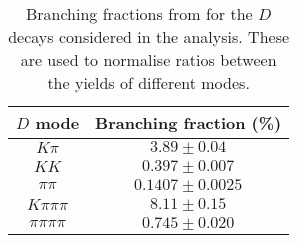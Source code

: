 \begin{table}
  \centering
  \begin{tabular}{cc}
      \toprule
      $D$ mode & Branching fraction (\%) \\
      \midrule
$K\pi$ & $3.89 \pm 0.04$ \\
$KK$ & $0.397 \pm 0.007$ \\
$\pi\pi$ & $0.1407 \pm 0.0025$ \\
$K\pi\pi\pi$ & $8.11 \pm 0.15$ \\
$\pi\pi\pi\pi$ & $0.745 \pm 0.020$ \\
      \bottomrule
  \end{tabular}
  \caption{Branching fractions from\cite{PDG2018} for the $D$ decays considered in the analysis. These are used to normalise ratios between the yields of different modes.}
\label{tab:branching_fractions}
\end{table}
